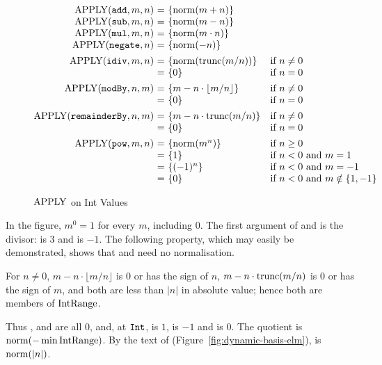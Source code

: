 \begin{figure}[htbp]
\centering
\small
\[
\begin{array}{@{}r@{\ }c@{\ }l@{\quad}l@{}}
\APPLY(\kw{add},m,n) & = & \{\norm(m+n)\} & \\
\APPLY(\kw{sub},m,n) & = & \{\norm(m-n)\} & \\
\APPLY(\kw{mul},m,n) & = & \{\norm(m\cdot n)\} & \\
\APPLY(\kw{negate},n) & = & \{\norm(-n)\} & \\[1ex]
\APPLY(\kw{idiv},m,n) & = & \{\norm(\dbtrunc(m/n))\} & \text{if}\ n\neq 0\\
                      & = & \{0\} & \text{if}\ n=0\\[1ex]
\APPLY(\kw{modBy},n,m) & = & \{m-n\cdot\lfloor m/n\rfloor\} & \text{if}\ n\neq 0\\
                       & = & \{0\} & \text{if}\ n=0\\[1ex]
\APPLY(\kw{remainderBy},n,m) & = & \{m-n\cdot\dbtrunc(m/n)\} & \text{if}\ n\neq 0\\
                             & = & \{0\} & \text{if}\ n=0\\[1ex]
\APPLY(\kw{pow},m,n) & = & \{\norm(m^{n})\} & \text{if}\ n\geq 0\\
                     & = & \{1\} & \text{if}\ n<0\ \text{and}\ m=1\\
                     & = & \{(-1)^{n}\} & \text{if}\ n<0\ \text{and}\ m=-1\\
                     & = & \{0\} & \text{if}\ n<0\ \text{and}\ m\notin\{1,-1\}
\end{array}
\]
\caption{$\mathrm{APPLY}$ on Int Values}\label{fig:dynamic-basis-int}
\end{figure}

In the figure, $m^{0}=1$ for every $m$, including $0$. The first argument of
 and  is the divisor:  is $3$ and
 is $-1$. The following property, which may easily be
demonstrated, shows that  and  need no
normalisation.
\begin{property}
For $n\neq 0$, $m-n\cdot\lfloor m/n\rfloor$ is $0$ or has the sign of $n$,
$m-n\cdot\mathrm{trunc}(m/n)$ is $0$ or has the sign of $m$, and both are less than
$|n|$ in absolute value; hence both are members of $\mathrm{IntRange}$.
\end{property}
Thus ,  and  are all $0$, and,
at $\mathtt{Int}$,  is $1$,  is $-1$
and  is $0$. %
The quotient  is $\mathrm{norm}(-\min\mathrm{IntRange})$. %
By the text of  (Figure~\ref{fig:dynamic-basis-elm}),  is
$\mathrm{norm}(|n|)$. %

